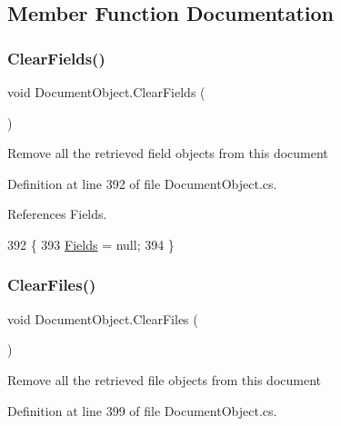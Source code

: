 \subsection{Member Function Documentation}
\mbox{\label{class_document_object_a28ab6562c34b5cf44ce7ab738d1730e1}} 
\subsubsection{\texorpdfstring{Clear\+Fields()}{ClearFields()}}
{\footnotesize\ttfamily void Document\+Object.\+Clear\+Fields (\begin{DoxyParamCaption}{ }\end{DoxyParamCaption})}



Remove all the retrieved field objects from this document 



Definition at line 392 of file Document\+Object.\+cs.



References Fields.


\begin{DoxyCode}
392                               \{
393         \mbox{\hyperlink{class_document_object_ae203b8a3e40b6c428145d2335b71245c}{Fields}} = null;
394     \}
\end{DoxyCode}
\mbox{\label{class_document_object_a4caebae7aec2a9375112739d2cf29f29}} 
\subsubsection{\texorpdfstring{Clear\+Files()}{ClearFiles()}}
{\footnotesize\ttfamily void Document\+Object.\+Clear\+Files (\begin{DoxyParamCaption}{ }\end{DoxyParamCaption})}



Remove all the retrieved file objects from this document 



Definition at line 399 of file Document\+Object.\+cs.



